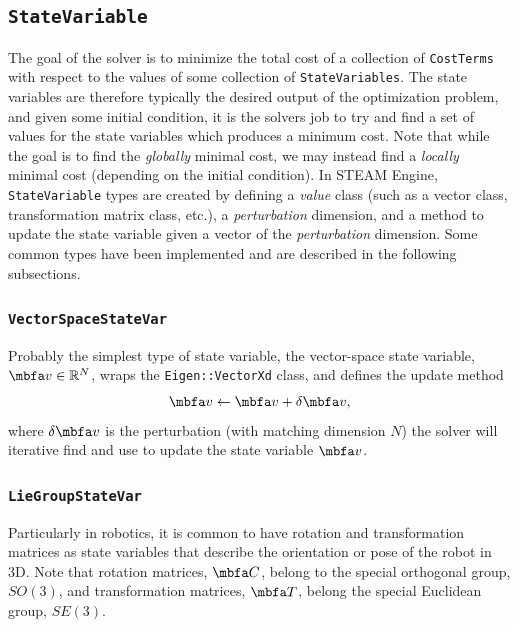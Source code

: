 \documentclass[10pt,letterpaper,fleqn,oneside]{article}
\newcommand{\code}[1]{\texttt{#1}}
\begin{document}
\subsection{\code{StateVariable}}
\label{sec:state_variable}

The goal of the solver is to minimize the total cost of a collection of \code{CostTerms} with respect to the values of some collection of \code{StateVariables}.
The state variables are therefore typically the desired output of the optimization problem, and given some initial condition, it is the solvers job to try and find a set of values for the state variables which produces a minimum cost.
Note that while the goal is to find the \emph{globally} minimal cost, we may instead find a \emph{locally} minimal cost (depending on the initial condition).
In STEAM Engine, \code{StateVariable} types are created by defining a \emph{value} class (such as a vector class, transformation matrix class, etc.), a \emph{perturbation} dimension, and a method to update the state variable given a vector of the \emph{perturbation} dimension.
Some common types have been implemented and are described in the following subsections.

\subsubsection{\code{VectorSpaceStateVar}}
\label{sec:vec}

Probably the simplest type of state variable, the vector-space state variable, $\mbf{v} \in \mathbb{R}^N$, wraps the \code{Eigen::VectorXd} class, and defines the update method
%
\begin{equation}
\label{eq:vs_updates}
\mbf{v} \leftarrow \mbf{v} + \delta\mbf{v},
\end{equation}
%
where $\delta\mbf{v}$ is the perturbation (with matching dimension $N$) the solver will iterative find and use to update the state variable $\mbf{v}$.

\subsubsection{\code{LieGroupStateVar}}
\label{sec:lg}

Particularly in robotics, it is common to have rotation and transformation matrices as state variables that describe the orientation or pose of the robot in 3D. Note that rotation matrices, $\mbf{C}$, belong to the special orthogonal group, $SO(3)$, and transformation matrices, $\mbf{T}$, belong the special Euclidean group, $SE(3)$.
\end{document}
